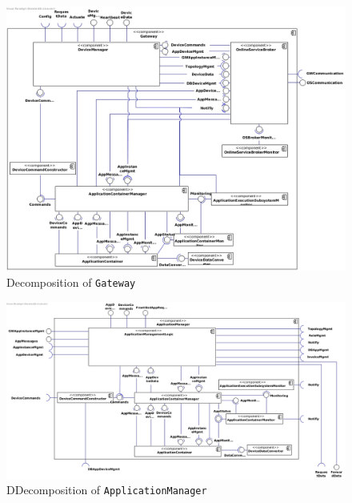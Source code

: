 

\begin{landscape}
    \begin{figure}[!htp]
    	\centering
    	\includegraphics[width=\linewidth]{images/component-diagram-Gateway}
        \caption{Decomposition of \texttt{Gateway}}
    \end{figure}
\end{landscape}

\begin{landscape}
    \centering
    \vspace*{\fill}

    \begin{figure}[!htp]
    	\centering
    	\includegraphics[width=\linewidth]{images/component-diagram-ApplicationManager}
        \caption{DDecomposition of \texttt{ApplicationManager}}
    \end{figure}

    \vfill
\end{landscape}


